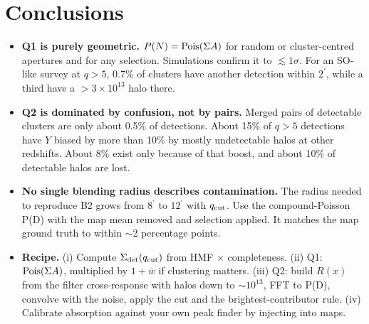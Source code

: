 \documentclass[10pt]{article}
\newcommand{\amin}{^{\prime}}
\begin{document}
\section{Conclusions}
\begin{itemize}
\item \textbf{Q1 is purely geometric.} $P(N)={\rm Pois}(\Sigma A)$ for random or cluster-centred apertures and for any selection. Simulations confirm it to $\lesssim1\sigma$. For an SO-like survey at $q>5$, 0.7\% of clusters have another detection within $2\amin$, while a third have a $>3\times10^{13}$ halo there.
\item \textbf{Q2 is dominated by confusion, not by pairs.} Merged pairs of detectable clusters are only about 0.5\% of detections. About 15\% of $q>5$ detections have $Y$ biased by more than 10\% by mostly undetectable halos at other redshifts. About 8\% exist only because of that boost, and about 10\% of detectable halos are lost.
\item \textbf{No single blending radius describes contamination.} The radius needed to reproduce B2 grows from $8\amin$ to $12\amin$ with $q_{\rm cut}$. Use the compound-Poisson P(D) with the map mean removed and selection applied. It matches the map ground truth to within $\sim$2 percentage points.
\item \textbf{Recipe.} (i) Compute $\Sigma_{\rm det}(q_{\rm cut})$ from HMF $\times$ completeness. (ii) Q1: ${\rm Pois}(\Sigma A)$, multiplied by $1+\bar w$ if clustering matters. (iii) Q2: build $R(x)$ from the filter cross-response with halos down to $\sim10^{13}$, FFT to P(D), convolve with the noise, apply the cut and the brightest-contributor rule. (iv) Calibrate absorption against your own peak finder by injecting into maps.
\end{itemize}
\end{document}
